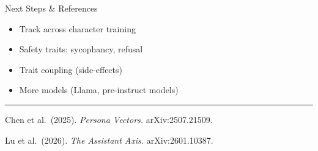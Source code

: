 \documentclass[a1paper]{article}
\newcommand{\smallbody}{\fontsize{18}{23}\selectfont\color{eracharcoal}}
\newcommand{\captionsize}{\fontsize{16}{21}\selectfont\color{eracharcoal}}
\begin{document}
\begin{minipage}[t][\remainingheight]{0.32\textwidth}
\begin{posterblock}[equal height group=row4]{Next Steps \& References}
\smallbody
\begin{itemize}[leftmargin=4mm, itemsep=2pt, labelsep=2mm, topsep=0pt]
    \item[\color{eracrimson}\textbullet] Track across character training
    \item[\color{eracrimson}\textbullet] Safety traits: sycophancy, refusal
    \item[\color{eracrimson}\textbullet] Trait coupling (side-effects)
    \item[\color{eracrimson}\textbullet] More models (Llama, pre-instruct models)
\end{itemize}
\vfill
{\color{eracrimson}\rule{\linewidth}{0.5pt}}
\vspace{1mm}
{\captionsize
Chen et al.\ (2025). \emph{Persona Vectors.} arXiv:2507.21509.\par\smallskip
Lu et al.\ (2026). \emph{The Assistant Axis.} arXiv:2601.10387.\par
}
\end{posterblock}
\end{minipage}

\end{document}
